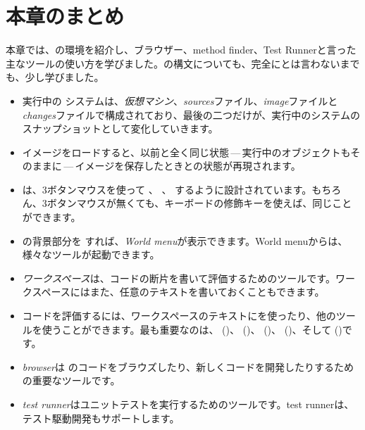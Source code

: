 \documentclass[a4paper,10pt,twoside]{book}
\begin{document}
\section{本章のまとめ}
本章では、\pharo の環境を紹介し、ブラウザー、method finder、Test Runnerと言った主なツールの使い方を学びました。\pharo の構文についても、完全にとは言わないまでも、少し学びました。

\begin{itemize}
  \item 実行中の \pharo システムは、\emph{仮想マシン}、\emph{sources}ファイル、\emph{image}ファイルと\emph{changes}ファイルで構成されており、最後の二つだけが、実行中のシステムのスナップショットとして変化していきます。
  \item \pharo イメージをロードすると、以前と全く同じ状態\,---\,実行中のオブジェクトもそのままに\,---\,イメージを保存したときとの状態が再現されます。
  \item \pharo は、3ボタンマウスを使って \click、 \actclick、 \metaclick するように設計されています。もちろん、3ボタンマウスが無くても、キーボードの修飾キーを使えば、同じことができます。
  \item \pharo の背景部分を \click すれば、\emph{World menu}が表示できます。World menuからは、様々なツールが起動できます。
  \item \emph{ワークスペース}は、コードの断片を書いて評価するためのツールです。ワークスペースにはまた、任意のテキストを書いておくこともできます。
  \item コードを評価するには、ワークスペースのテキストにを使ったり、他のツールを使うことができます。最も重要なのは、 ()、 ()、 ()、 ()、そして ()です。
  \item \emph{browser}は \pharo のコードをブラウズしたり、新しくコードを開発したりするための重要なツールです。
  \item \emph{test runner}はユニットテストを実行するためのツールです。test runnerは、テスト駆動開発もサポートします。
\end{itemize}

\ifx\wholebook\relax\else 
   
   
\end{document}
